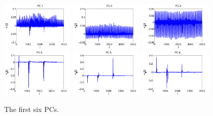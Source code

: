 \begin{figure}
\includegraphics[width=0.31\textwidth]{figures/PC1.pdf} 
\includegraphics[width=0.31\textwidth]{figures/PC2.pdf} 
\includegraphics[width=0.31\textwidth]{figures/PC3.pdf} \\
\includegraphics[width=0.31\textwidth]{figures/PC4.pdf} 
\includegraphics[width=0.31\textwidth]{figures/PC5.pdf} 
\includegraphics[width=0.31\textwidth]{figures/PC6.pdf} 
\caption{The first six PCs.}\label{fig:6components}
\end{figure}
